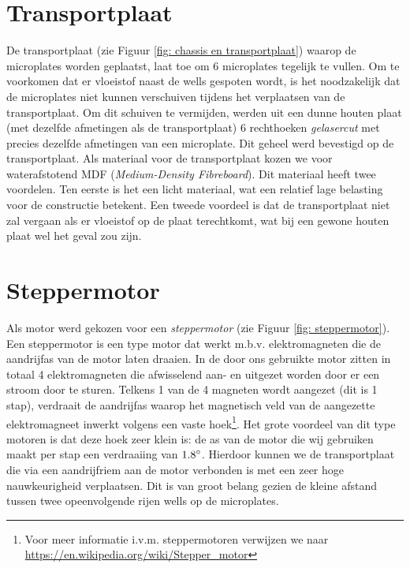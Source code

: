 \documentclass[a4paper,twoside,kulak]{kulakreport} %
\begin{document}
\section{Transportplaat}

De transportplaat (zie Figuur \ref{fig: chassis en transportplaat}) waarop de microplates worden geplaatst, laat toe om 6 microplates tegelijk te vullen. Om te voorkomen dat er vloeistof naast de wells gespoten wordt, is het noodzakelijk dat de microplates niet kunnen verschuiven tijdens het verplaatsen van de transportplaat. Om dit schuiven te vermijden, werden uit een dunne houten plaat (met dezelfde afmetingen als de transportplaat) 6 rechthoeken \textit{gelasercut} met precies dezelfde afmetingen van een microplate. Dit geheel werd bevestigd op de transportplaat. Als materiaal voor de transportplaat kozen we voor waterafstotend MDF (\textit{Medium-Density Fibreboard}). Dit materiaal heeft twee voordelen. Ten eerste is het een licht materiaal, wat een relatief lage belasting voor de constructie betekent. Een tweede voordeel is dat de transportplaat niet zal vergaan als er vloeistof op de plaat terechtkomt, wat bij een gewone houten plaat wel het geval zou zijn.  \\


\section{Steppermotor}

Als motor werd gekozen voor een \textit{steppermotor} (zie Figuur \ref{fig: steppermotor}). Een steppermotor is een type motor dat werkt m.b.v. elektromagneten die de aandrijfas van de motor laten draaien. In de door ons gebruikte motor zitten in totaal 4 elektromagneten die afwisselend aan- en uitgezet worden door er een stroom door te sturen. Telkens 1 van de 4 magneten wordt aangezet (dit is 1 stap), verdraait de aandrijfas waarop het magnetisch veld van de aangezette elektromagneet inwerkt volgens een vaste hoek\footnote{Voor meer informatie i.v.m. steppermotoren verwijzen we naar \url{https://en.wikipedia.org/wiki/Stepper_motor}}. Het grote voordeel van dit type motoren is dat deze hoek zeer klein is: de as van de motor die wij gebruiken maakt per stap een verdraaiing van $1.8\degree$. Hierdoor kunnen we de transportplaat die via een aandrijfriem aan de motor verbonden is met een zeer hoge nauwkeurigheid verplaatsen. Dit is van groot belang gezien de kleine afstand tussen twee opeenvolgende rijen wells op de microplates. 
\end{document}
